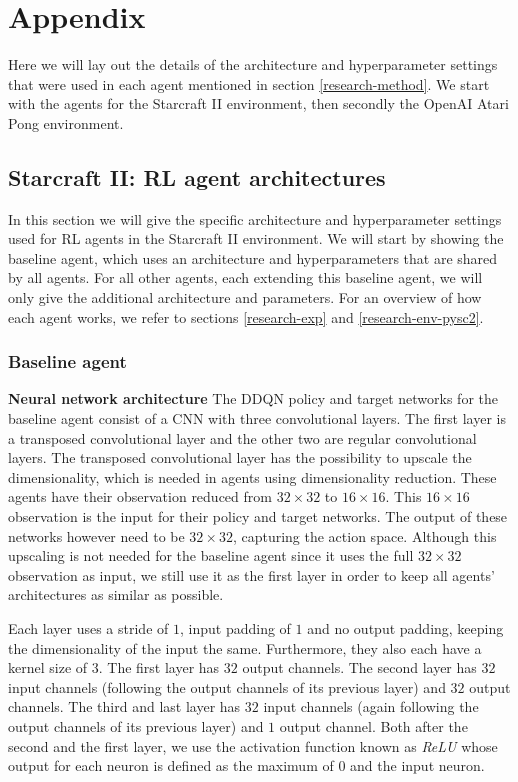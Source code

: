\chapter{Appendix}\label{appendix}
Here we will lay out the details of the architecture and hyperparameter settings that were used in each agent mentioned in section \ref{research-method}. We start with the agents for the Starcraft II environment, then secondly the OpenAI Atari Pong environment.

\section{Starcraft II: RL agent architectures}\label{appendix-agents}
In this section we will give the specific architecture and hyperparameter settings used for RL agents in the Starcraft II environment. We will start by showing the baseline agent, which uses an architecture and hyperparameters that are shared by all agents. For all other agents, each extending this baseline agent, we will only give the additional architecture and parameters. For an overview of how each agent works, we refer to sections \ref{research-exp} and \ref{research-env-pysc2}.


\subsection{Baseline agent}\label{appendix-baseline}
\textbf{Neural network architecture}\newline
\noindent The DDQN policy and target networks for the baseline agent consist of a CNN with three convolutional layers. The first layer is a transposed convolutional layer \cite{transpose} and the other two are regular convolutional layers. The transposed convolutional layer has the possibility to upscale the dimensionality, which is needed in agents using dimensionality reduction. These agents have their observation reduced from $32 \times 32$ to $16 \times 16$. This $16 \times 16$ observation is the input for their policy and target networks. The output of these networks however need to be $32 \times 32$, capturing the action space. Although this upscaling is not needed for the baseline agent since it uses the full $32 \times 32$ observation as input, we still use it as the first layer in order to keep all agents' architectures as similar as possible.

Each layer uses a stride of $1$, input padding of $1$ and no output padding, keeping the dimensionality of the input the same. Furthermore, they also each have a kernel size of $3$. The first layer has $32$ output channels. The second layer has $32$ input channels (following the output channels of its previous layer) and $32$ output channels. The third and last layer has $32$ input channels (again following the output channels of its previous layer) and $1$ output channel. Both after the second and the first layer, we use the activation function known as \emph{ReLU} \cite{relu} whose output for each neuron is defined as the maximum of $0$ and the input neuron.


